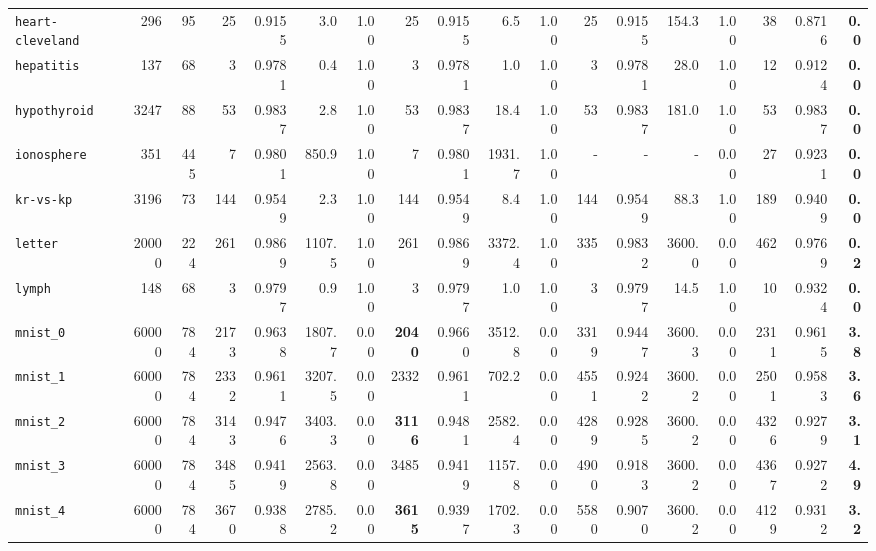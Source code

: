 \begin{tabular}{lccrrrrrrrrrrrrrrr}
\texttt{heart-cleveland} & \multicolumn{1}{r}{296} & \multicolumn{1}{r}{95}  & 25 & 0.9155 & 3.0 & 1.00 & 25 & 0.9155 & 6.5 & 1.00 & 25 & 0.9155 & 154.3 & 1.00 & 38 & 0.8716 & \textbf{0.0}\\
\texttt{hepatitis} & \multicolumn{1}{r}{137} & \multicolumn{1}{r}{68}  & 3 & 0.9781 & 0.4 & 1.00 & 3 & 0.9781 & 1.0 & 1.00 & 3 & 0.9781 & 28.0 & 1.00 & 12 & 0.9124 & \textbf{0.0}\\
\texttt{hypothyroid} & \multicolumn{1}{r}{3247} & \multicolumn{1}{r}{88}  & 53 & 0.9837 & 2.8 & 1.00 & 53 & 0.9837 & 18.4 & 1.00 & 53 & 0.9837 & 181.0 & 1.00 & 53 & 0.9837 & \textbf{0.0}\\
\texttt{ionosphere} & \multicolumn{1}{r}{351} & \multicolumn{1}{r}{445}  & 7 & 0.9801 & 850.9 & 1.00 & 7 & 0.9801 & 1931.7 & 1.00 & - & - & - & 0.00 & 27 & 0.9231 & \textbf{0.0}\\
\texttt{kr-vs-kp} & \multicolumn{1}{r}{3196} & \multicolumn{1}{r}{73}  & 144 & 0.9549 & 2.3 & 1.00 & 144 & 0.9549 & 8.4 & 1.00 & 144 & 0.9549 & 88.3 & 1.00 & 189 & 0.9409 & \textbf{0.0}\\
\texttt{letter} & \multicolumn{1}{r}{20000} & \multicolumn{1}{r}{224}  & 261 & 0.9869 & 1107.5 & 1.00 & 261 & 0.9869 & 3372.4 & 1.00 & 335 & 0.9832 & 3600.0 & 0.00 & 462 & 0.9769 & \textbf{0.2}\\
\texttt{lymph} & \multicolumn{1}{r}{148} & \multicolumn{1}{r}{68}  & 3 & 0.9797 & 0.9 & 1.00 & 3 & 0.9797 & 1.0 & 1.00 & 3 & 0.9797 & 14.5 & 1.00 & 10 & 0.9324 & \textbf{0.0}\\
\texttt{mnist\_0} & \multicolumn{1}{r}{60000} & \multicolumn{1}{r}{784}  & 2173 & 0.9638 & 1807.7 & 0.00 & \textbf{2040} & 0.9660 & 3512.8 & 0.00 & 3319 & 0.9447 & 3600.3 & 0.00 & 2311 & 0.9615 & \textbf{3.8}\\
\texttt{mnist\_1} & \multicolumn{1}{r}{60000} & \multicolumn{1}{r}{784}  & 2332 & 0.9611 & 3207.5 & 0.00 & 2332 & 0.9611 & 702.2 & 0.00 & 4551 & 0.9242 & 3600.2 & 0.00 & 2501 & 0.9583 & \textbf{3.6}\\
\texttt{mnist\_2} & \multicolumn{1}{r}{60000} & \multicolumn{1}{r}{784}  & 3143 & 0.9476 & 3403.3 & 0.00 & \textbf{3116} & 0.9481 & 2582.4 & 0.00 & 4289 & 0.9285 & 3600.2 & 0.00 & 4326 & 0.9279 & \textbf{3.1}\\
\texttt{mnist\_3} & \multicolumn{1}{r}{60000} & \multicolumn{1}{r}{784}  & 3485 & 0.9419 & 2563.8 & 0.00 & 3485 & 0.9419 & 1157.8 & 0.00 & 4900 & 0.9183 & 3600.2 & 0.00 & 4367 & 0.9272 & \textbf{4.9}\\
\texttt{mnist\_4} & \multicolumn{1}{r}{60000} & \multicolumn{1}{r}{784}  & 3670 & 0.9388 & 2785.2 & 0.00 & \textbf{3615} & 0.9397 & 1702.3 & 0.00 & 5580 & 0.9070 & 3600.2 & 0.00 & 4129 & 0.9312 & \textbf{3.2}\\

\end{tabular}
